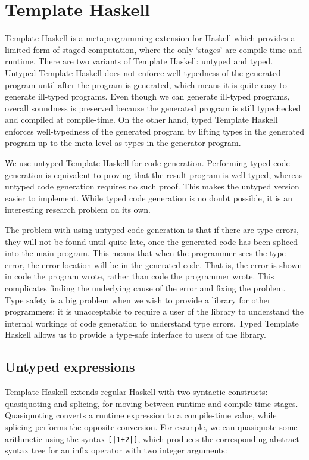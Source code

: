 \section{Template Haskell}
Template Haskell is a metaprogramming extension for Haskell \cite{sheard2002template} which provides a limited form of staged computation, where the only `stages' are compile-time and runtime.
There are two variants of Template Haskell: untyped and typed.
Untyped Template Haskell does not enforce well-typedness of the generated program until after the program is generated, which means it is quite easy to generate ill-typed programs.
Even though we can generate ill-typed programs, overall soundness is preserved because the generated program is still typechecked and compiled at compile-time.
On the other hand, typed Template Haskell enforces well-typedness of the generated program by lifting types in the generated program up to the meta-level as types in the generator program.

We use untyped Template Haskell for code generation.
Performing typed code generation is equivalent to proving that the result program is well-typed, whereas untyped code generation requires no such proof.
This makes the untyped version easier to implement.
While typed code generation is no doubt possible, it is an interesting research problem on its own.

The problem with using untyped code generation is that if there are type errors, they will not be found until quite late, once the generated code has been spliced into the main program.
This means that when the programmer sees the type error, the error location will be in the generated code.
That is, the error is shown in code the program wrote, rather than code the programmer wrote.
This complicates finding the underlying cause of the error and fixing the problem.
Type safety is a big problem when we wish to provide a library for other programmers: it is unacceptable to require a user of the library to understand the internal workings of code generation to understand type errors.
Typed Template Haskell allows us to provide a type-safe interface to users of the library.

\subsection{Untyped expressions}

Template Haskell extends regular Haskell with two syntactic constructs: quasiquoting and splicing, for moving between runtime and compile-time stages.
Quasiquoting converts a runtime expression to a compile-time value, while splicing performs the opposite conversion.
For example, we can quasiquote some arithmetic using the syntax \lstinline/[|1+2|]/, which produces the corresponding abstract syntax tree for an infix operator with two integer arguments:

